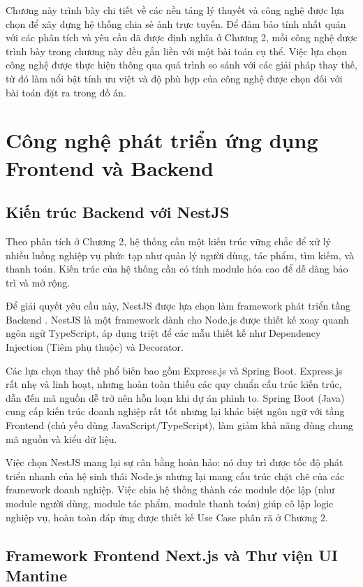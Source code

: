 
Chương này trình bày chi tiết về các nền tảng lý thuyết và công nghệ được lựa chọn để xây dựng hệ thống chia sẻ ảnh trực tuyến. Để đảm bảo tính nhất quán với các phân tích và yêu cầu đã được định nghĩa ở Chương 2, mỗi công nghệ được trình bày trong chương này đều gắn liền với một bài toán cụ thể. Việc lựa chọn công nghệ được thực hiện thông qua quá trình so sánh với các giải pháp thay thế, từ đó làm nổi bật tính ưu việt và độ phù hợp của công nghệ được chọn đối với bài toán đặt ra trong đồ án.

\section{Công nghệ phát triển ứng dụng Frontend và Backend}

\subsection{Kiến trúc Backend với NestJS}

Theo phân tích ở Chương 2, hệ thống cần một kiến trúc vững chắc để xử lý nhiều luồng nghiệp vụ phức tạp như quản lý người dùng, tác phẩm, tìm kiếm, và thanh toán. Kiến trúc của hệ thống cần có tính module hóa cao để dễ dàng bảo trì và mở rộng.

Để giải quyết yêu cầu này, NestJS được lựa chọn làm framework phát triển tầng Backend \cite{nestjs}. NestJS là một framework dành cho Node.js được thiết kế xoay quanh ngôn ngữ TypeScript, áp dụng triệt để các mẫu thiết kế như Dependency Injection (Tiêm phụ thuộc) và Decorator. 

Các lựa chọn thay thế phổ biến bao gồm Express.js và Spring Boot. Express.js rất nhẹ và linh hoạt, nhưng hoàn toàn thiếu các quy chuẩn cấu trúc kiến trúc, dẫn đến mã nguồn dễ trở nên hỗn loạn khi dự án phình to. Spring Boot (Java) cung cấp kiến trúc doanh nghiệp rất tốt nhưng lại khác biệt ngôn ngữ với tầng Frontend (chủ yếu dùng JavaScript/TypeScript), làm giảm khả năng dùng chung mã nguồn và kiểu dữ liệu.

Việc chọn NestJS mang lại sự cân bằng hoàn hảo: nó duy trì được tốc độ phát triển nhanh của hệ sinh thái Node.js nhưng lại mang cấu trúc chặt chẽ của các framework doanh nghiệp. Việc chia hệ thống thành các module độc lập (như module người dùng, module tác phẩm, module thanh toán) giúp cô lập logic nghiệp vụ, hoàn toàn đáp ứng được thiết kế Use Case phân rã ở Chương 2.

\subsection{Framework Frontend Next.js và Thư viện UI Mantine}

